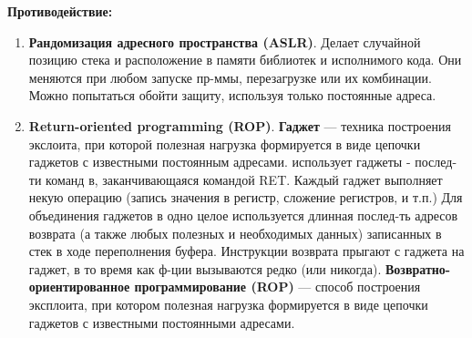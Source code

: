 \textbf{Противодействие:}
\begin{enumerate}
    \item \textbf{Рандомизация адресного пространства (ASLR)}. Делает случайной позицию стека и расположение в памяти библиотек и исполнимого кода. Они меняются при любом запуске пр-ммы, перезагрузке или их комбинации. Можно попытаться обойти защиту, используя только постоянные адреса.
    \item  \textbf{Return-oriented programming (ROP)}. \textbf{Гаджет} —  техника построения экслоита, при которой полезная нагрузка формируется в виде цепочки гаджетов с известными постоянным адресами. использует гаджеты - послед-ти команд в, заканчивающаяся командой RET. Каждый гаджет выполняет некую операцию (запись значения в регистр, сложение регистров, и т.п.)
    Для объединения гаджетов в одно целое используется длинная послед-ть адресов возврата (а также любых полезных и необходимых данных) записанных в стек в ходе переполнения буфера. Инструкции возврата прыгают с гаджета на гаджет, в то время как ф-ции вызываются редко (или никогда).
    \textbf{ Возвратно-ориентированное программирование (ROP) }— способ построения эксплоита, при котором полезная нагрузка формируется в виде цепочки гаджетов с известными постоянными адресами. 
\end{enumerate}